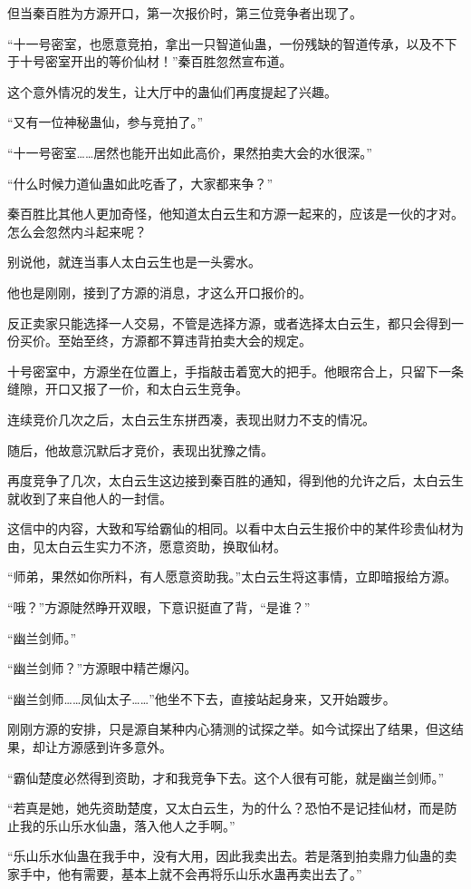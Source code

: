 \begin{this_body}
但当秦百胜为方源开口，第一次报价时，第三位竞争者出现了。

“十一号密室，也愿意竞拍，拿出一只智道仙蛊，一份残缺的智道传承，以及不下于十号密室开出的等价仙材！”秦百胜忽然宣布道。

这个意外情况的发生，让大厅中的蛊仙们再度提起了兴趣。

“又有一位神秘蛊仙，参与竞拍了。”

“十一号密室……居然也能开出如此高价，果然拍卖大会的水很深。”

“什么时候力道仙蛊如此吃香了，大家都来争？”

秦百胜比其他人更加奇怪，他知道太白云生和方源一起来的，应该是一伙的才对。怎么会忽然内斗起来呢？

别说他，就连当事人太白云生也是一头雾水。

他也是刚刚，接到了方源的消息，才这么开口报价的。

反正卖家只能选择一人交易，不管是选择方源，或者选择太白云生，都只会得到一份买价。至始至终，方源都不算违背拍卖大会的规定。

十号密室中，方源坐在位置上，手指敲击着宽大的把手。他眼帘合上，只留下一条缝隙，开口又报了一价，和太白云生竞争。

连续竞价几次之后，太白云生东拼西凑，表现出财力不支的情况。

随后，他故意沉默后才竞价，表现出犹豫之情。

再度竞争了几次，太白云生这边接到秦百胜的通知，得到他的允许之后，太白云生就收到了来自他人的一封信。

这信中的内容，大致和写给霸仙的相同。以看中太白云生报价中的某件珍贵仙材为由，见太白云生实力不济，愿意资助，换取仙材。

“师弟，果然如你所料，有人愿意资助我。”太白云生将这事情，立即暗报给方源。

“哦？”方源陡然睁开双眼，下意识挺直了背，“是谁？”

“幽兰剑师。”

“幽兰剑师？”方源眼中精芒爆闪。

“幽兰剑师……凤仙太子……”他坐不下去，直接站起身来，又开始踱步。

刚刚方源的安排，只是源自某种内心猜测的试探之举。如今试探出了结果，但这结果，却让方源感到许多意外。

“霸仙楚度必然得到资助，才和我竞争下去。这个人很有可能，就是幽兰剑师。”

“若真是她，她先资助楚度，又太白云生，为的什么？恐怕不是记挂仙材，而是防止我的乐山乐水仙蛊，落入他人之手啊。”

“乐山乐水仙蛊在我手中，没有大用，因此我卖出去。若是落到拍卖鼎力仙蛊的卖家手中，他有需要，基本上就不会再将乐山乐水蛊再卖出去了。”


\end{this_body}
